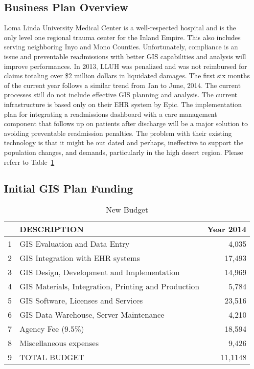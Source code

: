 \documentclass[11pt]{article}\usepackage[]{graphicx}\usepackage[]{color}
\begin{document}
\begin{itemize}
\begin{itemize}
\section{Business Plan Overview}

Loma Linda University Medical Center is a well-respected hospital and is the only level one regional trauma center for the Inland Empire. This also includes serving neighboring Inyo and Mono Counties. Unfortunately, compliance is an issue and preventable readmissions with better GIS capabilities and analysis will improve performances. In 2013, LLUH was penalized and was not reimbursed for claims totaling over \$2 million dollars in liquidated damages. The first six months of the current year follows a similar trend from Jan to June, 2014. The current processes still do not include effective GIS planning and analysis. The current infrastructure is based only on their EHR system by Epic. The implementation plan for integrating a readmissions dashboard  with a care management component that follows up on patients after discharge will be a major solution to avoiding preventable readmission penalties. The problem with their existing technology is that it might be out dated and perhaps, ineffective to support the population changes, and demands, particularly in the high desert region. Please referr to Table~\ref{tbl:NewBudget}

\subsection{Initial GIS Plan Funding}


\begin{table}[!h]
\centering
\begin{tabular}{rlr}
  \hline
 & DESCRIPTION & Year 2014 \\ 
  \hline
1 & GIS Evaluation and Data Entry & 4,035 \\ 
  2 & GIS Integration with EHR systems & 17,493 \\ 
  3 & GIS Design, Development and Implementation & 14,969 \\ 
  4 & GIS Materials, Integration, Printing and Production & 5,784 \\ 
  5 & GIS Software, Licenses and Services & 23,516 \\ 
  6 & GIS Data Warehouse, Server Maintenance & 4,210 \\ 
  7 & Agency Fee (9.5\%)  & 18,594 \\ 
  8 & Miscellaneous expenses & 9,426 \\ 
  9 & TOTAL BUDGET & 11,1148 \\ 
   \hline
\end{tabular}
\caption{New Budget}
    \label{tbl:NewBudget}
\end{table}




\end{itemize}
\end{itemize}
\end{document}
